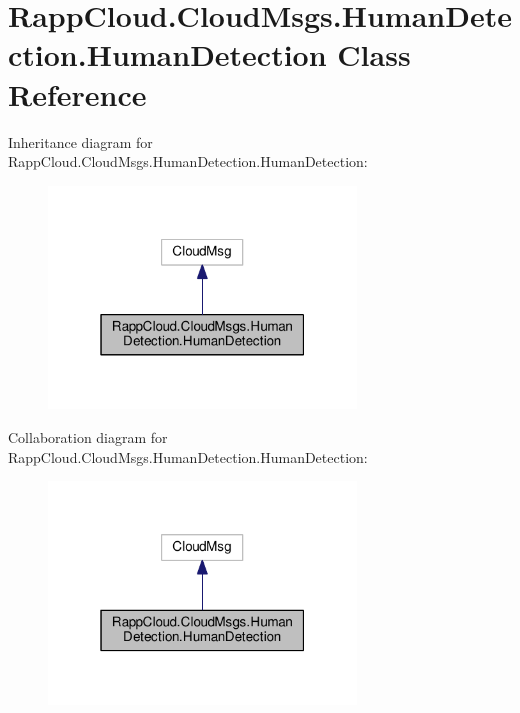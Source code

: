 \hypertarget{classRappCloud_1_1CloudMsgs_1_1HumanDetection_1_1HumanDetection}{\section{Rapp\-Cloud.\-Cloud\-Msgs.\-Human\-Detection.\-Human\-Detection Class Reference}
\label{classRappCloud_1_1CloudMsgs_1_1HumanDetection_1_1HumanDetection}
}


Inheritance diagram for Rapp\-Cloud.\-Cloud\-Msgs.\-Human\-Detection.\-Human\-Detection\-:
\nopagebreak
\begin{figure}[H]
\begin{center}
\leavevmode
\includegraphics[width=232pt]{classRappCloud_1_1CloudMsgs_1_1HumanDetection_1_1HumanDetection__inherit__graph}
\end{center}
\end{figure}


Collaboration diagram for Rapp\-Cloud.\-Cloud\-Msgs.\-Human\-Detection.\-Human\-Detection\-:
\nopagebreak
\begin{figure}[H]
\begin{center}
\leavevmode
\includegraphics[width=232pt]{classRappCloud_1_1CloudMsgs_1_1HumanDetection_1_1HumanDetection__coll__graph}
\end{center}
\end{figure}
